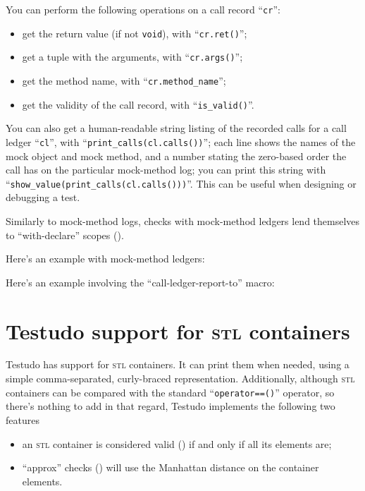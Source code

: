 \documentclass[twoside, a4paper, article]{memoir}
\providecommand\typesetexample[1]{%
}
\begin{document}
You can perform the following operations on a call record ``\texttt{cr}'':
\begin{itemize}
\item get the return value (if not \texttt{void}), with ``\texttt{cr.ret()}'';
\item get a tuple with the arguments, with ``\texttt{cr.args()}'';
\item get the method name, with ``\texttt{cr.method\_name}'';
\item get the validity of the call record, with ``\texttt{is\_valid()}''.
\end{itemize}

You can also get a human-readable string listing of the recorded calls for a
call ledger ``\texttt{cl}'', with ``\texttt{print\_calls(cl.calls())}''; each
line shows the names of the mock object and mock method, and a number stating
the zero-based order the call has on the particular mock-method log; you can
print this string with ``\texttt{show\_value(print\_calls(cl.calls()))}''.
This can be useful when designing or debugging a test.

Similarly to mock-method logs, checks with mock-method ledgers lend themselves
to ``with-declare'' scopes ().

Here's an example with mock-method ledgers:

\typesetexample{ledger-with-declare}

Here's an example involving the ``call-ledger-report-to'' macro:

\typesetexample{ledger-call-ledger-report-to}


\chapter{Testudo support for \textsc{stl} containers}
\label{cha:testudo-support-stl-types}

Testudo has support for \textsc{stl} containers. It can print them when needed,
using a simple comma-separated, curly-braced representation.  Additionally,
although \textsc{stl} containers can be compared with the standard
``\texttt{operator==()}'' operator, so there's nothing to add in that regard,
Testudo implements the following two features
\begin{itemize}
\item an \textsc{stl} container is considered valid
  () if and only if all its elements are;
\item ``approx'' checks () will use
  the Manhattan distance on the container elements.
\end{itemize}
\end{document}
